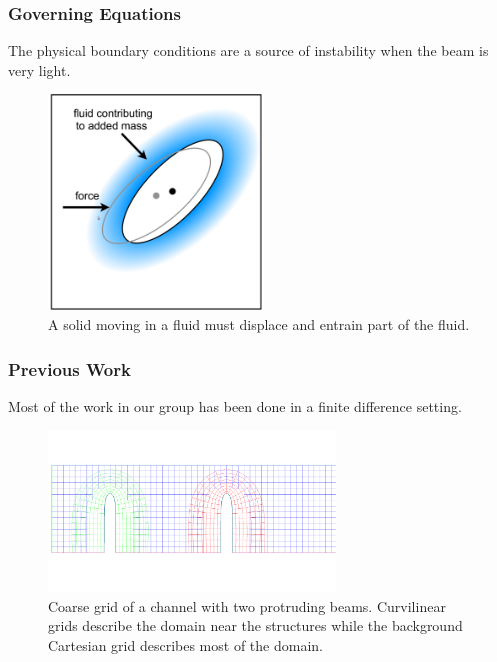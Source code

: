 \documentclass[8pt]{beamer}
\begin{document}
\begin{frame}
    \frametitle{Governing Equations}
    The physical boundary conditions are a source of instability when the beam
    is very light.

    \begin{figure}
        \centering
        \includegraphics[width=2.25in]{right.png}

        \caption{A solid moving in a fluid must displace and entrain part of the
        fluid.}
    \end{figure}
\end{frame}

\begin{frame}
    \frametitle{Previous Work}
    Most of the work in our group has been done in a finite difference setting.
    \begin{figure}
        \centering

        \includegraphics[width=3in]{longfei.png}

        \caption{Coarse grid of a channel with two protruding beams. Curvilinear
        grids describe the domain near the structures while the background
        Cartesian grid describes most of the domain.}
    \end{figure}
\end{frame}
\end{document}
